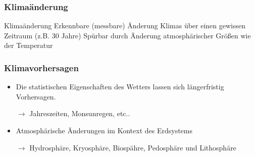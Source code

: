 \begin{frame}
	\frametitle{Klimaänderung}
	\begin{block}{Klimaänderung}
		Erkennbare (messbare) Änderung Klimas über einen gewissen Zeitraum (z.B. 30 Jahre) %
		Spürbar durch Änderung atmosphärischer Größen wie der Temperatur
	\end{block}



\end{frame}

\begin{frame}
	\frametitle{Klimavorhersagen} %
	\begin{itemize}
		\item Die statistischen Eigenschaften des Wetters lassen sich längerfristig Vorhersagen.
		\item[$\rightarrow$] Jahreszeiten, Monsunregen, etc.. %
		\item Atmosphärische Änderungen im Kontext des Erdsystems
		\item [$\rightarrow$] Hydrosphäre, Kryosphäre, Biospähre, Pedosphäre und Lithosphäre %
	\end{itemize}

\end{frame}
